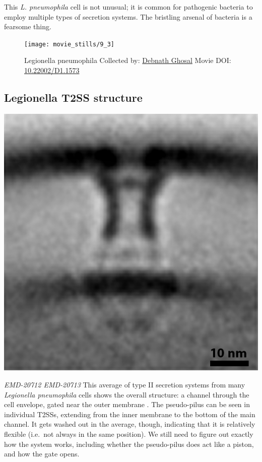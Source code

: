 \documentclass[]{tufte-book}
\begin{document}
This \emph{L. pneumophila} cell is not unusual; it is common for
pathogenic bacteria to employ multiple types of secretion systems. The
bristling arsenal of bacteria is a fearsome thing.





\begin{figure}
\texttt{[image: movie\_stills/9\_3]} \caption[Legionella pneumophila Collected by:
\protect\hyperlink{debnath_ghosal}{Debnath Ghosal} Movie DOI:
\href{https://doi.org/10.22002/D1.1573}{10.22002/D1.1573}]{Legionella pneumophila Collected by:
\protect\hyperlink{debnath_ghosal}{Debnath Ghosal} Movie DOI:
\href{https://doi.org/10.22002/D1.1573}{10.22002/D1.1573}}\label{fig:9-3}
\end{figure}

\subsection{Legionella T2SS structure}\label{Legionella_T2SS_structure}

\includegraphics{img/schematics/9_3_1}

\emph{EMD-20712 EMD-20713} This average of type II secretion systems
from many \emph{Legionella pneumophila} cells shows the overall
structure: a channel through the cell envelope, gated near the outer
membrane \citep{ghosal2019}. The pseudo-pilus can be seen in individual
T2SSs, extending from the inner membrane to the bottom of the main
channel. It gets washed out in the average, though, indicating that it
is relatively flexible (i.e.~not always in the same position). We still
need to figure out exactly how the system works, including whether the
pseudo-pilus does act like a piston, and how the gate opens.
\end{document}
